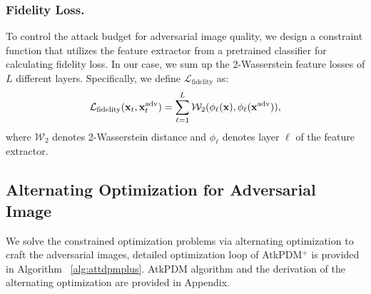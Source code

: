 \subsubsection{Fidelity Loss.}
To control the attack budget for adversarial image quality, we design a constraint function that utilizes the feature extractor from a pretrained classifier for calculating fidelity loss. In our case, we sum up the 2-Wasserstein feature losses of $L$ different layers. Specifically, we define $\mathcal{L}_\text{fidelity}$ as:
\begin{equation}
    \mathcal{L}_\text{fidelity}(\mathbf{x}_t, \mathbf{x}^{\adv}_t)
    = \sum_{\ell=1}^L \mathcal{W}_2(\phi_\ell(\mathbf{x}), \phi_\ell(\mathbf{x}^{\adv})),
\end{equation}
where $\mathcal{W}_2$ denotes 2-Wasserstein distance and $\phi_\ell$ denotes layer $\ell$ of the feature extractor.


\subsection{Alternating Optimization for Adversarial Image}
We solve the constrained optimization problems via alternating optimization to craft the adversarial images, detailed optimization loop of AtkPDM$^{+}$ is provided in Algorithm ~\ref{alg:attdpmplus}. AtkPDM algorithm and the derivation of the alternating optimization are provided in Appendix.


